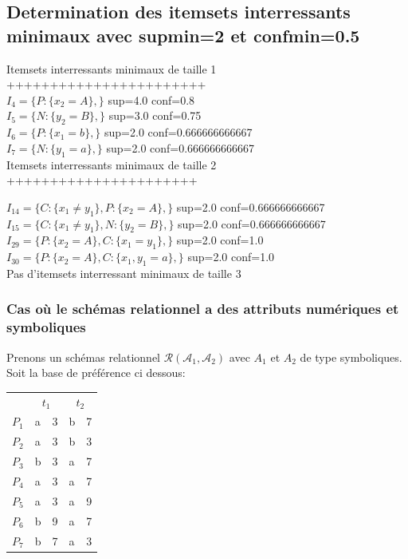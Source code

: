 \documentclass[a4paper,12pt,openany,oneside]{article}
\begin{document}
        
        
        \subsection{Determination des itemsets interressants minimaux avec supmin=2 et confmin=0.5}
        
        Itemsets interressants minimaux de taille 1 +++++++++++++++++++++++\\
        
        $I_{4}=\{P:\{x_{2}=A\},\}$  sup=4.0 conf=0.8\\
        $I_{5}=\{N:\{y_{2}=B\},\}$  sup=3.0 conf=0.75\\
        $I_{6}=\{P:\{x_{1}=b\},\}$  sup=2.0 conf=0.666666666667\\
        $I_{7}=\{N:\{y_{1}=a\},\}$  sup=2.0 conf=0.666666666667\\
        
        Itemsets interressants minimaux de taille 2 ++++++++++++++++++++++\
        
        $I_{14}=\{C:\{x_{1}\neq y_{1}\},P:\{x_{2}=A\},\}$  sup=2.0 conf=0.666666666667\\
        $I_{15}=\{C:\{x_{1}\neq y_{1}\},N:\{y_{2}=B\},\}$  sup=2.0 conf=0.666666666667\\
        $I_{29}=\{P:\{x_{2}=A\},C:\{x_{1}=y_{1}\},\}$  sup=2.0 conf=1.0\\
        $I_{30}=\{P:\{x_{2}=A\},C:\{x_{1},y_{1}=a\},\}$  sup=2.0 conf=1.0\\
        
        
        Pas d'itemsets interressant minimaux de taille 3\\
        
        
        
        \subsubsection{Cas où le schémas relationnel a des attributs numériques et symboliques}
        	Prenons un schémas relationnel $\mathcal{R}(\mathcal{A}_{1},\mathcal{A}_{2})$ avec $A_{1}$ et $A_{2}$ de type symboliques. Soit la base de préférence ci dessous:
        	\begin{center}
        	\begin{tabular}{l|l|l|l|l| } 
        	
        	&\multicolumn{2}{c|}{$t_{1}$} & \multicolumn{2}{c|}{$t_{2}$}\\
        	\cline{2-5}
        		$P_{1}$ & a & 3 & b & 7\\
        		$P_{2}$ & a & 3 & b & 3\\		
        		$P_{3}$ & b & 3 & a & 7\\
        		$P_{4}$ & a & 3 & a & 7\\
        		$P_{5}$ & a & 3 & a & 9\\
        		$P_{6}$ & b & 9 & a & 7\\
        		$P_{7}$ & b & 7 & a & 3\\
        	\cline{2-5}
        	\end{tabular}
        	\end{center}
        
\end{document}
